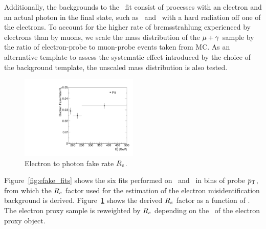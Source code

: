 Additionally, the backgrounds to the \Pe\Pgg\ fit consist of processes with an electron and an actual photon in the final state, such as \PW\Pgg\ and \Zee\ with a hard radiation off one of the electrons.
To account for the higher rate of bremsstrahlung experienced by electrons than by muons, we scale the mass distribution of the ${\mu}+\gamma$ sample by the ratio of electron-probe to muon-probe events taken from MC.
As an alternative template to assess the systematic effect introduced by the choice of the background template, the unscaled mass distribution is also tested.

\begin{figure}[htbp]
\centering
    \includegraphics[width=0.5\textwidth]{Analysis/Figures/efake/frate_data_ptalt.pdf} 
    \caption{
      Electron to photon fake rate $R_{{e}}$.
    }
    \label{fig:efake_frate}
\end{figure}


Figure~\ref{fig:efake_fits} shows the six fits performed on \Pe\Pe\ and \Pe\Pgg\ in bins of probe $p_{\mathrm{T}}$, from which the $R_{{e}}$ factor used for the estimation of the electron misidentification background is derived.
Figure~\ref{fig:efake_frate} shows the derived $R_{{e}}$ factor as a function of \ETg. 
The electron proxy sample is reweighted by $R_{{e}}$ depending on the \pt\ of the electron proxy object.

